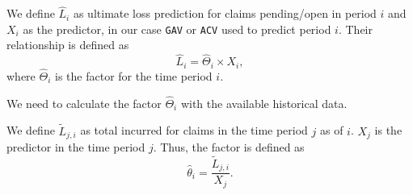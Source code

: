 	 
	\begin{Definition}
		We define $\hat{L}_i$ as ultimate loss prediction for claims pending/open in period $i$ and $X_i$ as the predictor, in our case \texttt{GAV} or \texttt{ACV} used to predict period $i$. Their relationship is defined as
		$$\hat{L}_i = \hat{\Theta}_i \times X_i,$$
		where $\hat{\Theta}_i$ is the factor for the time period $i$.
	\end{Definition}
	We need to calculate the factor $\hat{\Theta}_i$ with the available historical data. 
	\begin{Definition}
		We define $\widetilde{L}_{j,i}$ as total incurred for claims in the time period $j$ as of $i$. $X_j$ is the predictor in the time period $j$. Thus, the factor is defined as
		$$\hat{\theta}_i = \frac{\widetilde{L}_{j,i}}{X_j}.$$
	\end{Definition}

